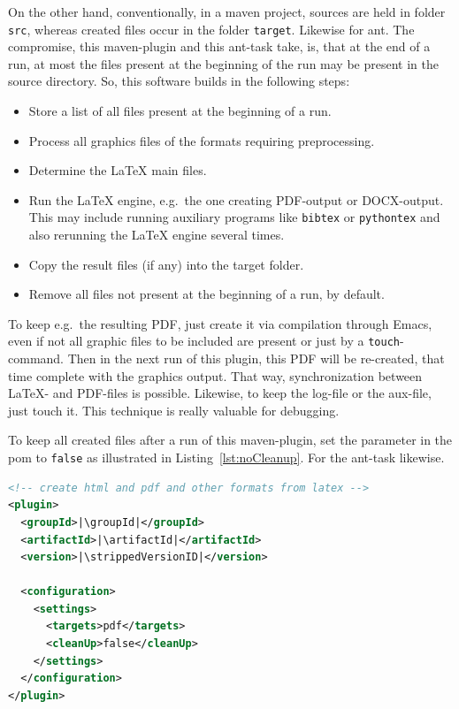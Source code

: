 On the other hand, 
conventionally, in a maven project, 
sources are held in folder \texttt{src}, 
whereas created files occur in the folder \texttt{target}. 
Likewise for ant. 
The compromise, this maven-plugin and this ant-task take, 
is, that at the end of a run, 
at most the files present at the beginning of the run 
may be present in the source directory. 
So, this software builds in the following steps: 
%
\begin{itemize}
\item
Store a list of all files present at the beginning of a run.
\item
Process all graphics files of the formats requiring preprocessing.
\item
Determine the \LaTeX{} main files.
\item
Run the \LaTeX{} engine, e.g.~the one creating PDF-output or DOCX-output.
This may include running auxiliary programs like \texttt{bibtex} or \texttt{pythontex} 
and also rerunning the \LaTeX{} engine several times. 
\item
Copy the result files (if any) into the target folder.
\item
Remove all files not present at the beginning of a run, by default. 
\end{itemize}

To keep e.g.~the resulting PDF, 
just create it via compilation through Emacs, 
even if not all graphic files to be included are present 
or just by a \texttt{touch}-command. 
Then in the next run of this plugin, 
this PDF will be re-created, 
that time complete with the graphics output. 
That way, synchronization between \LaTeX- and PDF-files is possible. 
Likewise, to keep the log-file or the aux-file, just touch it. 
This technique is really valuable for debugging. 

To keep all created files after a run of this maven-plugin, 
set the parameter  in the pom 
to \texttt{false} as illustrated in Listing~\ref{lst:noCleanup}. 
For the ant-task likewise. 

\begin{lstlisting}[language=xml, basicstyle=\small,
escapechar=|,
float=b, captionpos=b, label={lst:noCleanup},
caption={Configuration without cleanup}]
<!-- create html and pdf and other formats from latex -->
<plugin>
  <groupId>|\groupId|</groupId>
  <artifactId>|\artifactId|</artifactId>
  <version>|\strippedVersionID|</version>
	
  <configuration>
    <settings>
      <targets>pdf</targets>
      <cleanUp>false</cleanUp>
    </settings>
  </configuration>
</plugin>
\end{lstlisting}


